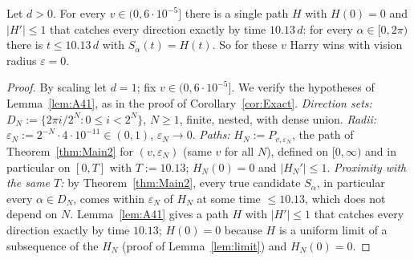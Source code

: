 \begin{corollary}\label{cor:Exact2}
Let $d>0$. For every $v\in(0,6\cdot10^{-5}]$ there is a single path $H$ with $H(0)=0$ and $|H'|\le1$ that catches every direction
exactly by time $10.13\,d$: for every $\alpha\in[0,2\pi)$ there is $t\le10.13\,d$ with $S_\alpha(t)=H(t)$. So for these $v$ Harry
wins with vision radius $\varepsilon=0$.
\end{corollary}
\begin{proof}
By scaling let $d=1$; fix $v\in(0,6\cdot10^{-5}]$. We verify the hypotheses of Lemma~\ref{lem:A41}, as in the proof of
Corollary~\ref{cor:Exact}.
\emph{Direction sets:} $D_N:=\{2\pi i/2^N:0\le i<2^N\}$, $N\ge1$, finite, nested, with dense union.
\emph{Radii:} $\varepsilon_N:=2^{-N}\cdot4\cdot10^{-11}\in(0,1)$, $\varepsilon_N\to0$.
\emph{Paths:} $H_N:=P_{v,\varepsilon_N}$, the path of Theorem~\ref{thm:Main2} for $(v,\varepsilon_N)$ (same $v$ for all $N$), defined on
$[0,\infty)$ and in particular on $[0,T]$ with $T:=10.13$; $H_N(0)=0$ and $|H_N'|\le1$.
\emph{Proximity with the same $T$:} by Theorem~\ref{thm:Main2}, every true candidate $S_\alpha$, in particular every
$\alpha\in D_N$, comes within $\varepsilon_N$ of $H_N$ at some time $\le10.13$, which does not depend on $N$.
Lemma~\ref{lem:A41} gives a path $H$ with $|H'|\le1$ that catches every direction exactly by time $10.13$; $H(0)=0$ because $H$ is
a uniform limit of a subsequence of the $H_N$ (proof of Lemma~\ref{lem:limit}) and $H_N(0)=0$.
\end{proof}

